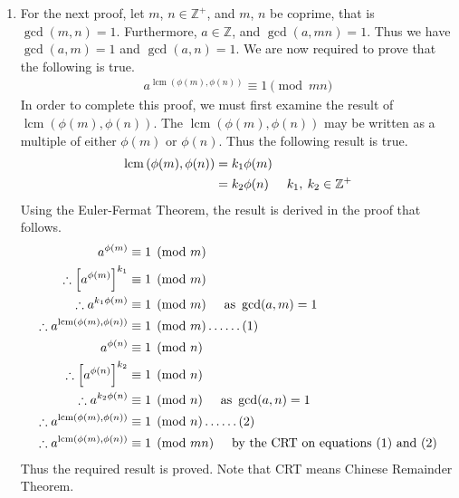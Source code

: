 \documentclass[a4paper]{article}
\DeclareMathOperator\lcm{lcm}
\begin{document}
\begin{enumerate}
\begin{enumerate}
		\item For the next proof, let $\displaystyle{m}$, $\displaystyle{n \in \mathbb{Z^+}}$, and $\displaystyle{m}$, $\displaystyle{n}$ be coprime, that is $\displaystyle{\gcd(m,n) = 1}$. Furthermore, $\displaystyle{a \in \mathbb{Z}}$, and $\displaystyle{\gcd(a,mn) = 1}$. Thus we have $\displaystyle{\gcd(a,m) = 1}$ and $\displaystyle{\gcd(a,n) = 1}$. We are now required to prove that the following is true. 
		\begin{align*}
		a^{\lcm\left(\phi(m),\phi(n) \right)} \equiv 1 \pmod{mn}
		\end{align*}
		In order to complete this proof, we must first examine the result of $\displaystyle{\lcm\left(\phi(m),\phi(n) \right)}$. The $\displaystyle{\lcm\left(\phi(m),\phi(n) \right)}$ may be written as a multiple of either $\displaystyle{\phi(m)}$ or $\displaystyle{\phi(n)}$. Thus the following result is true.
		\begin{align*}
		\lcm\left(\phi(m),\phi(n) \right) & = k_1\phi(m)\\
		& = k_2\phi(n) \hspace{5mm} k_1,\:k_2 \in \mathbb{Z}^+\\
		\end{align*}
		Using the Euler-Fermat Theorem, the result is derived in the proof that follows.
		\begin{align*}
		a^{\phi(m)} & \equiv 1 \pmod{m}\\
		\therefore \left[{a^{\phi(m)}}\right]^{k_1} & \equiv 1 \pmod{m}\\
		\therefore a^{k_1\phi(m)} & \equiv 1 \pmod{m} \hspace{5mm} \text{as } \gcd(a,m) = 1\\
		\therefore a^{\lcm\left(\phi(m),\phi(n) \right)} & \equiv 1 \pmod{m} \dots\dots (1)\\
		a^{\phi(n)} & \equiv 1 \pmod{n}\\
		\therefore \left[{a^{\phi(n)}}\right]^{k_2} & \equiv 1 \pmod{n}\\
		\therefore a^{k_2\phi(n)} & \equiv 1 \pmod{n} \hspace{5mm} \text{as } \gcd(a,n) = 1\\
		\therefore a^{\lcm\left(\phi(m),\phi(n) \right)} & \equiv 1 \pmod{n} \dots\dots (2)\\
		\therefore a^{\lcm\left(\phi(m),\phi(n) \right)} & \equiv 1 \pmod{mn} \hspace{5mm} \text{by the CRT on equations (1) and (2)}\\
		\end{align*}
		Thus the required result is proved. Note that CRT means Chinese Remainder Theorem.


\end{enumerate}
\end{enumerate}
\end{document}

